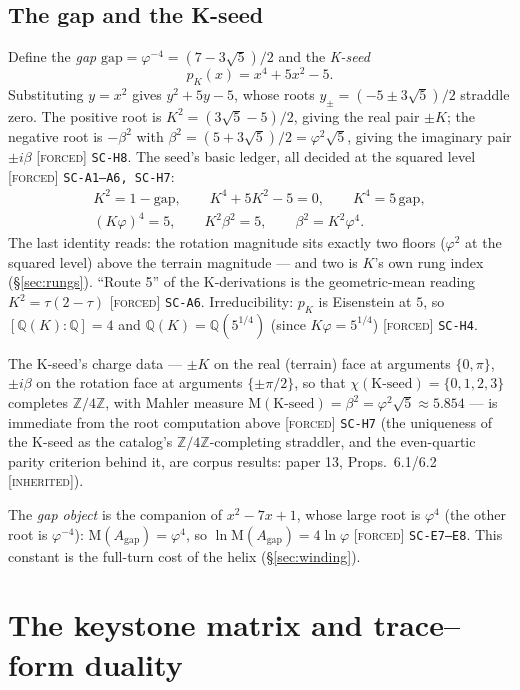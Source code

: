 \documentclass[11pt]{article}
\newcommand{\tagF}{\textcolor{cF}{\textsc{[forced]}}}
\newcommand{\tagI}{\textcolor{cI}{\textsc{[inherited]}}}
\newcommand{\hx}[1]{\textcolor{cC}{\footnotesize\texttt{#1}}}
\newcommand{\Q}{\mathbb{Q}}
\newcommand{\Z}{\mathbb{Z}}
\newcommand{\gp}{\varphi}
\newcommand{\gapc}{\mathrm{gap}}
\newcommand{\M}{\mathrm{M}}
\theoremstyle{plain}
\theoremstyle{definition}
\theoremstyle{remark}
\begin{document}
\subsection{The gap and the K-seed}\label{sec:kseed}
Define the \emph{gap} $\gapc=\gp^{-4}=(7-3\sqrt5)/2$ and the \emph{K-seed}
\[
p_K(x)=x^4+5x^2-5 .
\]
Substituting $y=x^2$ gives $y^2+5y-5$, whose roots
$y_\pm=(-5\pm3\sqrt5)/2$ straddle zero. The positive root is $K^2=(3\sqrt5-5)/2$,
giving the real pair $\pm K$; the negative root is $-\beta^2$ with
$\beta^2=(5+3\sqrt5)/2=\gp^2\sqrt5$, giving the imaginary pair $\pm i\beta$
\tagF{} \hx{SC-H8}. The seed's basic ledger, all decided at the squared level
\tagF{} \hx{SC-A1--A6, SC-H7}:
\begin{equation}\label{eq:kledger}
\begin{gathered}
K^2=1-\gapc,\qquad
K^4+5K^2-5=0,\qquad
K^4=5\,\gapc,\\
(K\gp)^4=5,\qquad
K^2\beta^2=5,\qquad
\beta^2=K^2\gp^4 .
\end{gathered}
\end{equation}
The last identity reads: the rotation magnitude sits exactly two floors ($\gp^2$ at
the squared level) above the terrain magnitude --- and two is $K$'s own rung index
(\S\ref{sec:rungs}). ``Route 5'' of the K-derivations is the geometric-mean reading
$K^2=\tau(2-\tau)$ \tagF{} \hx{SC-A6}. Irreducibility: $p_K$ is Eisenstein at $5$,
so $[\Q(K):\Q]=4$ and $\Q(K)=\Q(5^{1/4})$ (since $K\gp=5^{1/4}$) \tagF{} \hx{SC-H4}.

The K-seed's charge data --- $\pm K$ on the real (terrain) face at arguments
$\{0,\pi\}$, $\pm i\beta$ on the rotation face at arguments $\{\pm\pi/2\}$, so that
$\chi(\text{K-seed})=\{0,1,2,3\}$ completes $\Z/4\Z$, with Mahler measure
$\M(\text{K-seed})=\beta^2=\gp^2\sqrt5\approx 5.854$ --- is immediate from the root
computation above \tagF{} \hx{SC-H7} (the uniqueness of the K-seed as the catalog's
$\Z/4\Z$-completing straddler, and the even-quartic parity criterion behind it, are
corpus results: paper 13, Props.\ 6.1/6.2 \tagI{}).

The \emph{gap object} is the companion of $x^2-7x+1$, whose large root is $\gp^4$
(the other root is $\gp^{-4}$): $\M(A_{\gapc})=\gp^4$, so
$\ln\M(A_{\gapc})=4\ln\gp$ \tagF{} \hx{SC-E7--E8}. This constant is the full-turn
cost of the helix (\S\ref{sec:winding}).

\section{The keystone matrix and trace--form duality}\label{sec:keystone}
\end{document}
